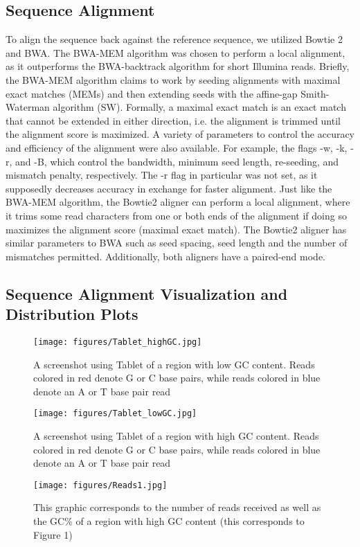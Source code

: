 \documentclass[12pt]{article}
\begin{document}
\subsection{Sequence Alignment}
To align the sequence back against the reference sequence, we utilized Bowtie 2 and BWA. The BWA-MEM algorithm was chosen to perform a local alignment, as it outperforms the BWA-backtrack algorithm for short Illumina reads. Briefly, the BWA-MEM algorithm claims to work by seeding alignments with maximal exact matches (MEMs) and then extending seeds with the affine-gap Smith-Waterman algorithm (SW). Formally, a maximal exact match is an exact match that cannot be extended in either direction, i.e. the alignment is trimmed until the alignment score is maximized.  A variety of parameters to control the accuracy and efficiency of the alignment were also available. For example, the flags -w, -k, -r, and -B, which control the bandwidth, minimum seed length, re-seeding, and mismatch penalty, respectively. The -r flag in particular was not set, as it supposedly decreases accuracy in exchange for faster alignment.  Just like the BWA-MEM algorithm, the Bowtie2 aligner can perform a local alignment, where it trims some read characters from one or both ends of the alignment if doing so maximizes the alignment score (maximal exact match). The Bowtie2 aligner has similar parameters to BWA such as seed spacing, seed length and the number of mismatches permitted. Additionally, both aligners have a paired-end mode.

\subsection{Sequence Alignment Visualization and Distribution Plots}
\begin{figure}
    \centering
    \texttt{[image: figures/Tablet\_highGC.jpg]}
    \caption{A screenshot using Tablet of a region with low GC content. Reads colored in red denote G or C base pairs, while reads colored in blue denote an A or T base pair read}
    \label{Figure 1}
    
    \texttt{[image: figures/Tablet\_lowGC.jpg]}
    \caption{A screenshot using Tablet of a region with high GC content. Reads colored in red denote G or C base pairs, while reads colored in blue denote an A or T base pair read}
    \label{Figure 2}
\end{figure}

\begin{figure}
    \centering
    \texttt{[image: figures/Reads1.jpg]}
    \caption{This graphic corresponds to the number of reads received as well as the GC\% of a region with high GC content (this corresponds to Figure 1)}
    \label{Figure 3}
\end{figure}
\end{document}
